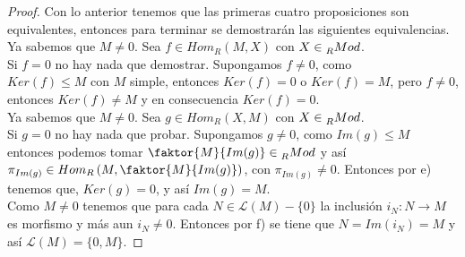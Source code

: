 \documentclass{article}
\newcommand{\La}{\mathscr{L}}
\theoremstyle{definition}
\theoremstyle{plain}
\theoremstyle{plain}
\theoremstyle{definition}
\theoremstyle{definition}
\theoremstyle{definition}
\theoremstyle{definition}
\theoremstyle{definition}
\theoremstyle{definition}
\begin{document}
\begin{enumerate}[label=\textbf{Ej \arabic*.}]
\begin{proof}
	Con lo anterior tenemos que las primeras cuatro proposiciones son equivalentes, entonces para terminar se demostrarán 
	las siguientes equivalencias.\\
	
	 Ya sabemos que $M\neq 0$. Sea $f\in Hom_R(M,X)$ con $X\in \prescript{}{R}{Mod}$.\\
	Si $f=0$ no hay nada que demostrar. Supongamos $f\neq 0$, como \\
	$Ker(f)\leq M$ con $M$ simple, entonces 
	$Ker(f)=0$ o $Ker(f)=M$, pero $f\neq 0$, entonces $Ker(f)\neq M$ y en consecuencia $Ker(f)=0$.\\
	
	 Ya sabemos que $M\neq 0$. Sea $g\in Hom_R(X,M)$ con $X\in \prescript{}{R}{Mod}$.\\
	Si $g=0$ no hay nada que probar. Supongamos $g\neq 0$, como $Im(g)\leq M$ entonces podemos tomar 
	$\faktor{M}{Im(g)} \in \prescript{}{R}{Mod}$ y así \\
	$\pi_{Im(g)}\in Hom_R\left(M,\faktor{M}{Im(g)}\right)$, con $\pi_{Im(g)}\neq 0 $. Entonces por e) tenemos  que, $Ker(g)=0$, y así $Im(g)=M$.\\
	
	 Como $M\neq 0$ tenemos que para cada $ N\in \La(M)-\{0\}$ la inclusión $i_N:N\longrightarrow M$
	es morfismo y más aun $i_N\neq 0$. Entonces por f) se tiene que $N=Im(i_N)=M$ y así $\La(M)=\{0,M\}$. 
\end{proof}


\end{enumerate}
\end{document}
